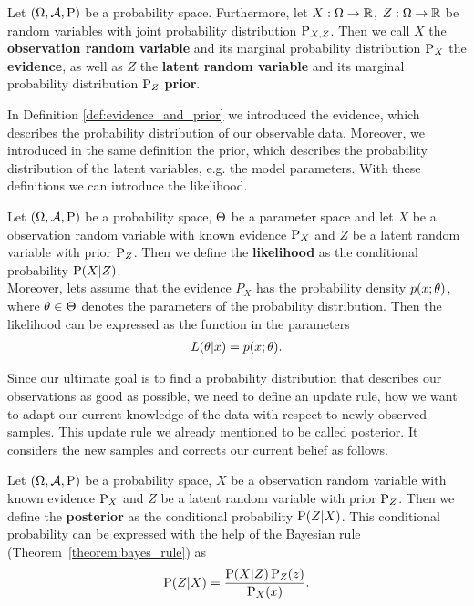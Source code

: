 \begin{definition}\label{def:evidence_and_prior}
Let $(\Omega, \operatorname{\mathcal{A}}, \operatorname{\text{P}})$ be a probability space. Furthermore, let $X:\Omega\to\operatorname{\mathbb{R}}$, $Z:\Omega\to\operatorname{\mathbb{R}}$ be random variables with joint probability distribution $\operatorname{\text{P}}_{X, Z}$. Then we call $X$ the \textbf{observation random variable} and its marginal probability distribution $\operatorname{\text{P}}_X$ the \textbf{evidence}, as well as $Z$ the \textbf{latent random variable} and its marginal probability distribution $\operatorname{\text{P}}_Z$ \textbf{prior}.
\end{definition}

In Definition \ref{def:evidence_and_prior} we introduced the evidence, which describes the probability distribution of our observable data. Moreover, we introduced in the same definition the prior, which describes the probability distribution of the latent variables, e.g. the model parameters. With these definitions we can introduce the likelihood.

\begin{definition}\label{def:likelihood}
Let $(\Omega,\operatorname{\mathcal{A}}, \operatorname{\text{P}})$ be a probability space, $\operatorname{\Theta}$ be a parameter space and let $X$ be a observation random variable with known evidence $\operatorname{\text{P}}_X$ and $Z$ be a latent random variable with prior $\operatorname{\text{P}}_Z$. Then we define the \textbf{likelihood} as the conditional probability $\operatorname{\text{P}}(X|Z)$.\\
Moreover, lets assume that the evidence $P_X$ has the probability density $p(x;\theta)$, where $\theta\in \operatorname{\Theta}$ denotes the parameters of the probability distribution. Then the likelihood can be expressed as the function in the parameters
\begin{align*}
L(\theta | x) = p(x;\theta).
\end{align*}
\end{definition}

Since our ultimate goal is to find a probability distribution that describes our observations as good as possible, we need to define an update rule, how we want to adapt our current knowledge of the data with respect to newly observed samples. This update rule we already mentioned to be called posterior. It considers the new samples and corrects our current belief as follows.

\begin{definition}\label{def:posterior}
Let $(\Omega,\operatorname{\mathcal{A}}, \operatorname{\text{P}})$ be a probability space, $X$ be a observation random variable with known evidence $\operatorname{\text{P}}_X$ and $Z$ be a latent random variable with prior $\operatorname{\text{P}}_Z$. Then we define the \textbf{posterior} as the conditional probability $\operatorname{\text{P}}(Z|X)$. This conditional probability can be expressed with the help of the Bayesian rule (Theorem~\ref{theorem:bayes_rule}) as
\begin{align*}
\operatorname{\text{P}}(Z|X) = \frac{\operatorname{\text{P}}(X|Z) \operatorname{\text{P}}_Z(z)}{\operatorname{\text{P}}_X(x)}.
\end{align*}
\end{definition}

